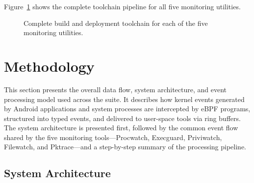 \documentclass{mnitjaipur}
\begin{document}
Figure~\ref{fig:toolchain} shows the complete toolchain pipeline for all five monitoring utilities.

\begin{figure}[H]
  \centering
  \caption{Complete build and deployment toolchain for each of the five monitoring utilities.}
  \label{fig:toolchain}
\end{figure}

\clearpage
\chapter{Methodology}
\label{ch:methodology}
This section presents the overall data flow, system architecture, and event processing model used across the suite. It describes how kernel events generated by Android applications and system processes are intercepted by eBPF programs, structured into typed events, and delivered to user-space tools via ring buffers. The system architecture is presented first, followed by the common event flow shared by the five monitoring tools---Procwatch, Execguard, Priviwatch, Filewatch, and Pktrace---and a step-by-step summary of the processing pipeline.

\section{System Architecture}
\end{document}
